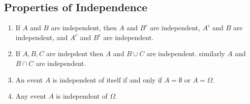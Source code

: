 \subsection{Properties of Independence}
\begin{enumerate}
    \item  If $A$ and $B$ are independent, then $A$ and $B^c$ are independent, $A^c$ and $B$ are independent, and $A^c$ and $B^c$ are independent.
    \item If $A,B,C$ are indepdent then $A$ and $B \cup C$ are independent. similarly $A$ and $B \cap C$ are independent.
    \item An event $A$ is independent of itself if and only if $A = \emptyset$ or $A = \Omega$.
    \item Any event $A$ is independent of $\Omega$.
\end{enumerate}


